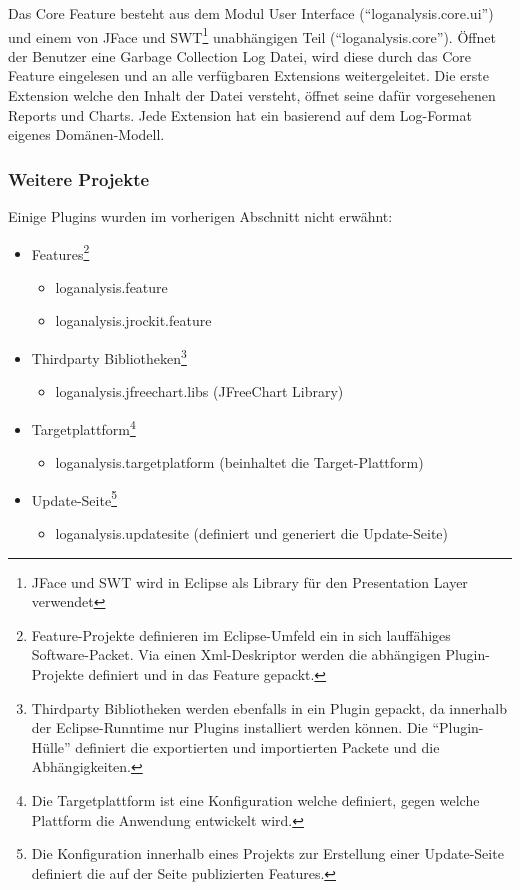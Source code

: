 Das Core Feature besteht aus dem Modul User Interface (``loganalysis.core.ui'') und einem von JFace und SWT\footnote{JFace und SWT wird in Eclipse als Library für den Presentation Layer verwendet} unabhängigen Teil (``loganalysis.core''). Öffnet der Benutzer eine Garbage Collection Log Datei, wird diese durch das Core Feature eingelesen und an alle verfügbaren Extensions weitergeleitet. Die erste Extension welche den Inhalt der Datei versteht, öffnet seine dafür vorgesehenen Reports und Charts. Jede Extension hat ein basierend auf dem Log-Format eigenes Domänen-Modell.

\subsubsection{Weitere Projekte}
Einige Plugins wurden im vorherigen Abschnitt nicht erwähnt:
\begin{itemize}
	\item Features\footnote{Feature-Projekte definieren im Eclipse-Umfeld ein in sich lauffähiges Software-Packet. Via einen Xml-Deskriptor werden die abhängigen Plugin-Projekte definiert und in das Feature gepackt.}
		\begin{itemize}
			\item loganalysis.feature
			\item loganalysis.jrockit.feature
		\end{itemize}
	\item Thirdparty Bibliotheken\footnote{Thirdparty Bibliotheken werden ebenfalls in ein Plugin gepackt, da innerhalb der Eclipse-Runntime nur Plugins installiert werden können. Die ``Plugin-Hülle'' definiert die exportierten und importierten Packete und die Abhängigkeiten.}
		\begin{itemize}
			\item  loganalysis.jfreechart.libs (JFreeChart Library)
		\end{itemize}
	\item Targetplattform\footnote{Die Targetplattform ist eine Konfiguration welche definiert, gegen welche Plattform die Anwendung entwickelt wird.}
		\begin{itemize}
			\item  loganalysis.targetplatform (beinhaltet die Target-Plattform)
		\end{itemize}
	\item Update-Seite\footnote{Die Konfiguration innerhalb eines Projekts zur Erstellung einer Update-Seite definiert die auf der Seite publizierten Features.}
		\begin{itemize}
			\item loganalysis.updatesite (definiert und generiert die Update-Seite)
		\end{itemize}
\end{itemize}

